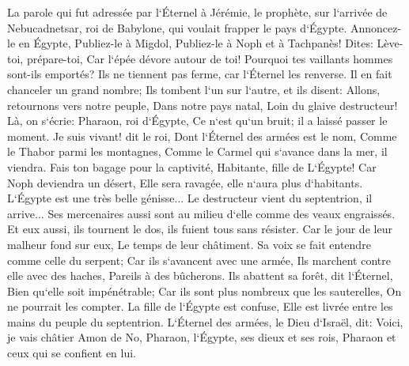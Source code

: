 \verse La parole qui fut adressée par l`Éternel à Jérémie, le prophète, sur l`arrivée de Nebucadnetsar, roi de Babylone, qui voulait frapper le pays d`Égypte. 
\verse Annoncez-le en Égypte, Publiez-le à Migdol, Publiez-le à Noph et à Tachpanès! Dites: Lève-toi, prépare-toi, Car l`épée dévore autour de toi! 
\verse Pourquoi tes vaillants hommes sont-ils emportés? Ils ne tiennent pas ferme, car l`Éternel les renverse. 
\verse Il en fait chanceler un grand nombre; Ils tombent l`un sur l`autre, et ils disent: Allons, retournons vers notre peuple, Dans notre pays natal, Loin du glaive destructeur! 
\verse Là, on s`écrie: Pharaon, roi d`Égypte, Ce n`est qu`un bruit; il a laissé passer le moment. 
\verse Je suis vivant! dit le roi, Dont l`Éternel des armées est le nom, Comme le Thabor parmi les montagnes, Comme le Carmel qui s`avance dans la mer, il viendra. 
\verse Fais ton bagage pour la captivité, Habitante, fille de L`Égypte! Car Noph deviendra un désert, Elle sera ravagée, elle n`aura plus d`habitants. 
\verse L`Égypte est une très belle génisse... Le destructeur vient du septentrion, il arrive... 
\verse Ses mercenaires aussi sont au milieu d`elle comme des veaux engraissés. Et eux aussi, ils tournent le dos, ils fuient tous sans résister. Car le jour de leur malheur fond sur eux, Le temps de leur châtiment. 
\verse Sa voix se fait entendre comme celle du serpent; Car ils s`avancent avec une armée, Ils marchent contre elle avec des haches, Pareils à des bûcherons. 
\verse Ils abattent sa forêt, dit l`Éternel, Bien qu`elle soit impénétrable; Car ils sont plus nombreux que les sauterelles, On ne pourrait les compter. 
\verse La fille de l`Égypte est confuse, Elle est livrée entre les mains du peuple du septentrion. 
\verse L`Éternel des armées, le Dieu d`Israël, dit: Voici, je vais châtier Amon de No, Pharaon, l`Égypte, ses dieux et ses rois, Pharaon et ceux qui se confient en lui. 
